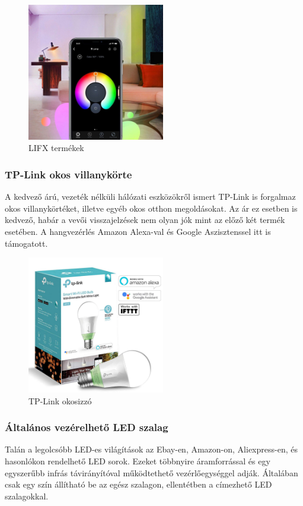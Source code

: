 \documentclass[../main.tex]{subfiles}
\begin{document}
\begin{figure}[h!]
                    \includegraphics[height=6cm]{irodalom_res/LIFX_app2}
                \caption{LIFX termékek\cite{led_lighting9}\cite{led_lighting10}}
                \label{fig:lifx}
             \end{figure}
        
        \subsubsection{TP-Link okos villanykörte}
            A kedvező árú, vezeték nélküli hálózati eszközökről ismert TP-Link is forgalmaz okos villanykörtéket, illetve egyéb okos otthon megoldásokat. Az ár ez esetben is kedvező, habár a vevői visszajelzések nem olyan jók mint az előző két termék esetében. A hangvezérlés Amazon Alexa-val és Google Aszisztenssel itt is támogatott.\cite{led_lighting11}
            \begin{figure}[h!] 
                \centering
                    \includegraphics[height=6cm]{irodalom_res/tplink_bulb}
                \caption{TP-Link okosizzó\cite{led_lighting11}}
                \label{fig:tplink_bulb}
             \end{figure}
        
        \subsubsection{Általános vezérelhető LED szalag} 
            Talán a legolcsóbb LED-es világítások az Ebay-en, Amazon-on, Aliexpress-en, és hasonlókon rendelhető LED sorok. Ezeket többnyire áramforrással és egy egyszerűbb infrás távirányítóval működtethető vezérlőegységgel adják. Általában csak egy szín állítható be az egész szalagon, ellentétben a címezhető LED szalagokkal. \cite{led_lighting12}
            
\end{document}

